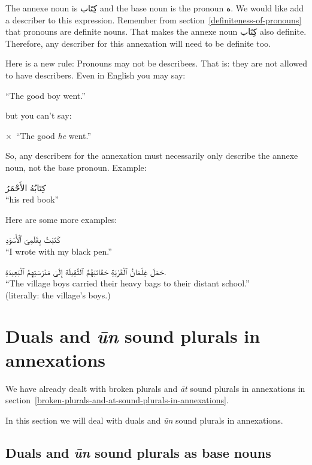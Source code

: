 \documentclass[
  10pt,
]{book}
\begin{document}
The annexe noun is \foreignlanguage{arabic}{کِتَاب} and the base noun is the pronoun \foreignlanguage{arabic}{ه}.
We would like add a describer to this expression.
Remember from section~\ref{definiteness-of-pronouns} that pronouns are definite nouns. That makes the annexe noun \foreignlanguage{arabic}{کِتَاب} also definite.
Therefore, any describer for this annexation will need to be definite too.

Here is a new rule: Pronouns may not be describees. That is: they are not allowed to have describers.
Even in English you may say:

\enquote{The good boy went.}

but you can't say:

\(\times\)~\enquote{The good \emph{he} went.}

So, any describers for the annexation must necessarily only describe the annexe noun, not the base pronoun. Example:

\foreignlanguage{arabic}{کِتَابُهُ الأَحْمَرُ}\\
\enquote{his red book}

Here are some more examples:

\foreignlanguage{arabic}{کَتَبْتُ بِقَلَمِيَ ٱلْأَسْوَدِ}\\
\enquote{I wrote with my black pen.}

\foreignlanguage{arabic}{حَمَلَ غِلْمَانُ ٱلْقَرْيَةِ حَقَائبَهُمُ ٱلثَّقِيلَة إِلَىٰ مَدْرَسَتِهِمُ ٱلْبَعِيدَةِ.}\\
\enquote{The village boys carried their heavy bags to their distant school.}\\
(literally: the village's boys.)

\section{\texorpdfstring{Duals and \emph{ūn} sound plurals in annexations}{Duals and ūn sound plurals in annexations}}\label{duals-and-sound-un-plurals-in-annexations}

We have already dealt with broken plurals and \emph{āt} sound plurals in annexations in
section~\ref{broken-plurals-and-at-sound-plurals-in-annexations}.

In this section we will deal with
duals and \emph{ūn} sound plurals in annexations.

\subsection{\texorpdfstring{Duals and \emph{ūn} sound plurals as base nouns}{Duals and ūn sound plurals as base nouns}}\label{duals-and-un-sound-plurals-as-base-nouns}
\end{document}
